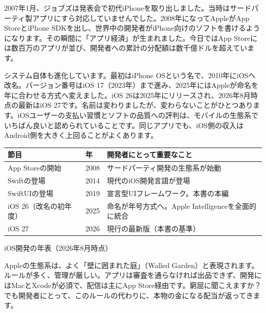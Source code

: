 


2007年1月、ジョブズは発表会で初代iPhoneを取り出しました。当時はサードパーティ製アプリにすら対応していませんでした。2008年になってAppleがApp StoreとiPhone SDKを出し、世界中の開発者がiPhone向けのソフトを書けるようになります。その瞬間に「アプリ経済」が生まれました。今日ではApp Storeには数百万のアプリが並び、開発者への累計の分配額は数千億ドルを超えています。

システム自体も進化しています。最初はiPhone OSという名で、2010年にiOSへ改名。バージョン番号はiOS 17（2023年）まで進み、2025年にはAppleが命名を年に合わせる方式へ変えました。iOS 26は2025年にリリースされ、2026年8月時点の最新はiOS 27です。名前は変わりましたが、変わらないことがひとつあります。iOSユーザーの支払い習慣とソフトの品質への評判は、モバイルの生態系でいちばん良いと認められていることです。同じアプリでも、iOS側の収入はAndroid側を大きく上回ることがよくあります。

\begin{center}
\begin{tabularx}{\linewidth}{|X|X|X|}
\hline
\textbf{節目} & \textbf{年} & \textbf{開発者にとって重要なこと} \tabularnewline
\hline
App Storeの開始 & 2008 & サードパーティ開発の生態系が始動 \tabularnewline
Swiftの登場 & 2014 & 現代のiOS開発言語が登場 \tabularnewline
SwiftUIの登場 & 2019 & 宣言型UIフレームワーク。本書の本編 \tabularnewline
iOS 26（改名の初年度） & 2025 & 命名が年号方式へ。Apple Intelligenceを全面的に統合 \tabularnewline
iOS 27 & 2026 & 現行の最新版（本書の基準） \tabularnewline
\hline
\end{tabularx}
\end{center}

\begin{center}\small\color{gray}iOS開発の年表（2026年8月時点）\end{center}


Appleの生態系は、よく「壁に囲まれた庭」（Walled Garden）と表現されます。ルールが多く、管理が厳しい。アプリは審査を通らなければ出品できず、開発にはMacとXcodeが必須で、配信は主にApp Store経由です。窮屈に聞こえますか？　でも開発者にとって、このルールの代わりに、本物の金になる配当が返ってきます。

